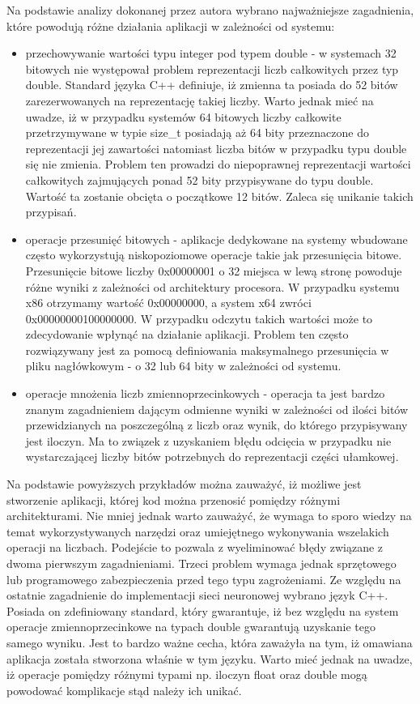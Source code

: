 Na podstawie analizy dokonanej przez autora wybrano najważniejsze zagadnienia, które powodują różne działania aplikacji w zależności od systemu:
\begin{itemize}
	\item przechowywanie wartości typu integer pod typem double - w systemach 32 bitowych nie występował problem reprezentacji liczb całkowitych przez typ double. Standard języka C++ definiuje, iż zmienna ta posiada do 52 bitów zarezerwowanych na reprezentację takiej liczby. Warto jednak mieć na uwadze, iż w przypadku systemów 64 bitowych liczby całkowite przetrzymywane w typie size\_t posiadają aż 64 bity przeznaczone do reprezentacji jej zawartości natomiast liczba bitów w przypadku typu double się nie zmienia. Problem ten prowadzi do niepoprawnej reprezentacji wartości całkowitych zajmujących ponad 52 bity przypisywane do typu double. Wartość ta zostanie obcięta o początkowe 12 bitów. Zaleca się unikanie takich przypisań.
	
	\item operacje przesunięć bitowych - aplikacje dedykowane na systemy wbudowane często wykorzystują niskopoziomowe operacje takie jak przesunięcia bitowe. Przesunięcie bitowe liczby 0x00000001 o 32 miejsca w lewą stronę powoduje różne wyniki z zależności od architektury procesora. W przypadku systemu x86 otrzymamy wartość 0x00000000, a system x64 zwróci 0x00000000100000000. W przypadku odczytu takich wartości może to zdecydowanie wpłynąć na działanie aplikacji. Problem ten często rozwiązywany jest za pomocą definiowania maksymalnego przesunięcia w pliku nagłówkowym - o 32 lub 64 bity w zależności od systemu.
	
	\item operacje mnożenia liczb zmiennoprzecinkowych -  operacja ta jest bardzo znanym zagadnieniem dającym odmienne wyniki w zależności od ilości bitów przewidzianych na poszczególną z liczb oraz wynik, do którego przypisywany jest iloczyn. Ma to związek z uzyskaniem błędu odcięcia w przypadku nie wystarczającej liczby bitów potrzebnych do reprezentacji części ułamkowej.
\end{itemize}

Na podstawie powyższych przykładów można zauważyć, iż możliwe jest stworzenie aplikacji, której kod można przenosić pomiędzy różnymi architekturami. Nie mniej jednak warto zauważyć, że wymaga to sporo wiedzy na temat wykorzystywanych narzędzi oraz umiejętnego wykonywania wszelakich operacji na liczbach. Podejście to pozwala z wyeliminować błędy związane z dwoma pierwszym zagadnieniami. Trzeci problem wymaga jednak sprzętowego lub programowego zabezpieczenia przed tego typu zagrożeniami. Ze względu na ostatnie zagadnienie do implementacji sieci neuronowej wybrano język C++. Posiada on zdefiniowany standard, który gwarantuje, iż bez względu na system operacje zmiennoprzecinkowe na typach double gwarantują uzyskanie tego samego wyniku. Jest to bardzo ważne cecha, która zaważyła na tym, iż omawiana aplikacja została stworzona właśnie w tym języku. Warto mieć jednak na uwadze, iż operacje pomiędzy różnymi typami np. iloczyn float oraz double mogą powodować komplikacje stąd należy ich unikać.

